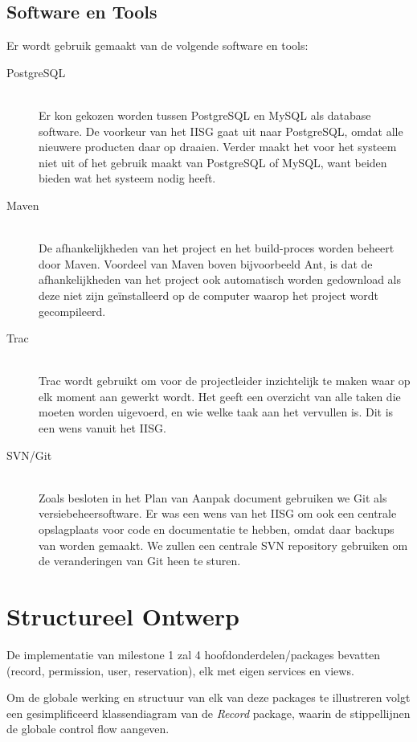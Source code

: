 \documentclass[a4paper,titlepage]{report}
\begin{document}
  \section{Software en Tools}
    Er wordt gebruik gemaakt van de volgende software en tools:
    \begin{description}
      \item[PostgreSQL]\hfill\\
        Er kon gekozen worden tussen PostgreSQL en MySQL als database software.
        De voorkeur van het IISG gaat uit naar PostgreSQL, omdat alle nieuwere
        producten daar op draaien. Verder maakt het voor het systeem niet uit of
        het gebruik maakt van PostgreSQL of MySQL, want beiden bieden wat het
        systeem nodig heeft. 
      \item[Maven]\hfill\\
        De afhankelijkheden van het project en het build-proces worden
        beheert door Maven. Voordeel van Maven boven bijvoorbeeld Ant, is dat de
        afhankelijkheden van het project ook automatisch worden gedownload als
        deze niet zijn ge\"installeerd op de computer waarop het project wordt
        gecompileerd.
      \item[Trac]\hfill\\
        Trac wordt gebruikt om voor de projectleider inzichtelijk te maken waar
        op elk moment aan gewerkt wordt. Het geeft een overzicht van alle taken
        die moeten worden uigevoerd, en wie welke taak aan het vervullen is. Dit
        is een wens vanuit het IISG.
      \item[SVN/Git]\hfill\\
        Zoals besloten in het Plan van Aanpak document gebruiken we Git als
        versiebeheersoftware. Er was een wens van het IISG om ook een centrale
        opslagplaats voor code en documentatie te hebben, omdat daar backups van
        worden gemaakt. We zullen een centrale SVN repository gebruiken om de
        veranderingen van Git heen te sturen.
    \end{description}


\chapter{Structureel Ontwerp}
  \label{cha:structureel-ontwerp}
    De implementatie van milestone 1 zal 4 hoofdonderdelen/packages bevatten
    (record, permission, user, reservation), elk met eigen services en views.

    Om de globale werking en structuur van elk van deze packages te illustreren
    volgt een gesimplificeerd klassendiagram van de \emph{Record} package,
    waarin de stippellijnen de globale control flow aangeven. 
    
\end{document}
